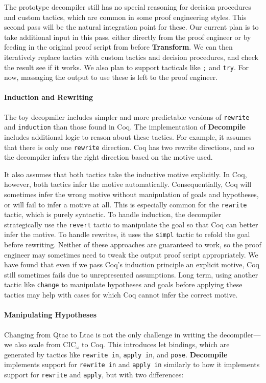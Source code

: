 The prototype decompiler still has no special reasoning for decision procedures and custom tactics, which are common
in some proof engineering styles.
This second pass will be the natural integration point for these.
Our current plan is to take additional input in this pass, either directly from the proof engineer
or by feeding in the original proof script from before \textbf{Transform}.
We can then iteratively replace tactics with custom tactics and decision procedures, and check the result see if it works.
We also plan to support tacticals like \lstinline{;} and \lstinline{try}.
For now, massaging the output to use these is left to the proof engineer.

\paragraph{Induction and Rewriting}
The toy decopmiler includes simpler and more predictable versions of \lstinline{rewrite} and \lstinline{induction}
than those found in Coq. The implementation of \textbf{Decompile} includes additional logic to reason about these tactics.
For example, it assumes that there is only one \lstinline{rewrite} direction. Coq has two rewrite directions,
and so the decompiler infers the right direction based on the motive used.

It also assumes that both tactics take the inductive motive explicitly.
In Coq, however, both tactics infer the motive automatically.
Consequentially, Coq will sometimes infer the wrong motive without manipulation of goals and hypotheses,
or will fail to infer a motive at all.
This is especially common for the \lstinline{rewrite} tactic, which is purely syntactic.
To handle induction, the decompiler strategically use the \lstinline{revert} tactic to manipulate the goal
so that Coq can better infer the motive.
To handle rewrites, it uses the \lstinline{simpl} tactic to refold the goal before rewriting.
Neither of these approaches are guaranteed to work, so the proof engineer may sometimes need to tweak the output proof script appropriately.
We have found that even if we pass Coq's induction principle an explicit motive, Coq still sometimes fails due
to unrepresented assumptions.
Long term, using another tactic like \lstinline{change} to manipulate hypotheses and goals before applying these tactics
may help with cases for which Coq cannot infer the correct motive.

\paragraph{Manipulating Hypotheses}
Changing from Qtac to Ltac is not the only challenge in writing the decompiler---we also scale from CIC$_{\omega}$ to Coq.
This introduces let bindings, which are generated by tactics like \lstinline{rewrite in}, \lstinline{apply in}, and \lstinline{pose}.
\textbf{Decompile} implements support for \lstinline{rewrite in} and \lstinline{apply in} similarly to how it implements support for
\lstinline{rewrite} and \lstinline{apply}, but with two differences:

